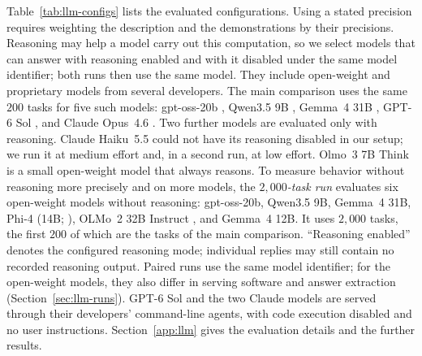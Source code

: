 Table~\ref{tab:llm-configs} lists the evaluated configurations. Using a stated precision requires weighting the description and the demonstrations by their precisions. Reasoning may help a model carry out this computation, so we select models that can answer with reasoning enabled and with it disabled under the same model identifier; both runs then use the same model. They include open-weight and proprietary models from several developers. The main comparison uses the same $200$ tasks for five such models: gpt-oss-20b \citep{openai2025}, Qwen3.5 9B \citep{qwen35}, Gemma~4 31B \citep{gemma4}, GPT-6 Sol \citep{openai2026sol}, and Claude Opus~4.6 \citep{anthropic2026opus}. Two further models are evaluated only with reasoning. Claude Haiku~5.5 \citep{anthropic2026haiku} could not have its reasoning disabled in our setup; we run it at medium effort and, in a second run, at low effort. Olmo~3 7B Think \citep{olmo2025three} is a small open-weight model that always reasons. To measure behavior without reasoning more precisely and on more models, the \emph{$2{,}000$-task run} evaluates six open-weight models without reasoning: gpt-oss-20b, Qwen3.5 9B, Gemma~4 31B, Phi-4 (14B; \citealp{abdin2024}), OLMo~2 32B Instruct \citep{walsh2025}, and Gemma~4 12B. It uses $2{,}000$ tasks, the first $200$ of which are the tasks of the main comparison. ``Reasoning enabled'' denotes the configured reasoning mode; individual replies may still contain no recorded reasoning output. Paired runs use the same model identifier; for the open-weight models, they also differ in serving software and answer extraction (Section~\ref{sec:llm-runs}). GPT-6 Sol and the two Claude models are served through their developers' command-line agents, with code execution disabled and no user instructions. Section~\ref{app:llm} gives the evaluation details and the further results.

